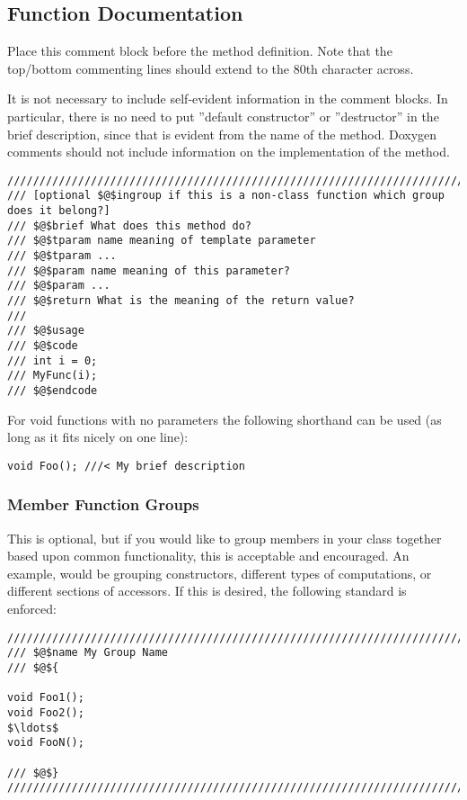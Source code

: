 \documentclass[12pt]{article}
\begin{document}
\subsection{Function Documentation}

Place this comment block before the method definition. Note that the top/bottom
commenting lines should extend to the 80th character across.

It is not necessary to include self-evident information in the comment blocks.
In particular, there is no need to put ”default constructor” or ”destructor” in
the brief description, since that is evident from the name of the method.
Doxygen comments should not include information on the implementation of the
method.

\begin{lstlisting}[mathescape]
///////////////////////////////////////////////////////////////////////////////
/// [optional $@$ingroup if this is a non-class function which group does it belong?]
/// $@$brief What does this method do?
/// $@$tparam name meaning of template parameter
/// $@$tparam ...
/// $@$param name meaning of this parameter?
/// $@$param ...
/// $@$return What is the meaning of the return value?
///
/// $@$usage
/// $@$code
/// int i = 0;
/// MyFunc(i);
/// $@$endcode
\end{lstlisting}

For void functions with no parameters the following shorthand can be used (as
long as it fits nicely on one line):
\begin{lstlisting}[mathescape]
void Foo(); ///< My brief description
\end{lstlisting}


\subsubsection{Member Function Groups}

This is optional, but if you would like to group members in your class together
based upon common functionality, this is acceptable and encouraged. An example,
would be grouping constructors, different types of computations, or different
sections of accessors. If this is desired, the following standard is enforced:

\begin{lstlisting}[mathescape]
///////////////////////////////////////////////////////////////////////////////
/// $@$name My Group Name
/// $@${

void Foo1();
void Foo2();
$\ldots$
void FooN();

/// $@$}
///////////////////////////////////////////////////////////////////////////////
\end{lstlisting}
\end{document}
